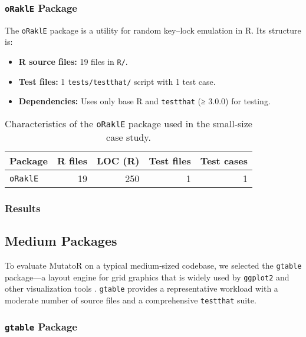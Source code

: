 \subsubsection{\texttt{oRaklE} Package}

The \texttt{oRaklE} package is a utility for random key–lock emulation in R. Its structure is:

\begin{itemize}
  \item \textbf{R source files:} 19 files in \texttt{R/}.  
  \item \textbf{Test files:} 1 \texttt{tests/testthat/} script with 1 test case.  
  \item \textbf{Dependencies:} Uses only base R and \texttt{testthat} (≥ 3.0.0) for testing.
\end{itemize}

\begin{table}[htbp]
  \centering
  \begin{tabular}{lrrrr}
    \toprule
    Package        & R files & LOC (R) & Test files & Test cases \\
    \midrule
    \texttt{oRaklE} & 19      & 250       & 1          & 1          \\
    \bottomrule
  \end{tabular}
  \caption{Characteristics of the \texttt{oRaklE} package used in the small‐size case study.}
  \label{tab:orakle-metrics}
\end{table}

\subsubsection{Results}

\subsection{Medium Packages}

To evaluate MutatoR on a typical medium‐sized codebase, we selected the \texttt{gtable} package—a layout engine for grid graphics that is widely used by \texttt{ggplot2} and other visualization tools \cite{pedersen2024gtable}.  \texttt{gtable} provides a representative workload with a moderate number of source files and a comprehensive \texttt{testthat} suite.

\subsubsection{\texttt{gtable} Package}

